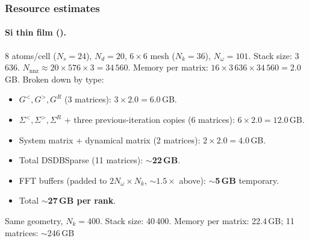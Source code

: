 \subsubsection{Resource estimates}

\paragraph{Si thin film (\cite{guo_quantum_2020}).}
8 atoms/cell ($N_s = 24$), $N_d = 20$, $6\times6$ mesh
($N_k = 36$), $N_\omega = 101$.  Stack size: 3\,636.
$N_\mathrm{nnz} \approx 20\times576\times3 = 34\,560$.
Memory per matrix: $16\times3\,636\times34\,560 = 2.0$\,GB.
Broken down by type:
\begin{itemize}
  \item $G^<, G^>, G^R$ (3 matrices): $3\times2.0 = 6.0$\,GB.
  \item $\Sigma^<, \Sigma^>, \Sigma^R$ + three previous-iteration copies
        (6 matrices): $6\times2.0 = 12.0$\,GB.
  \item System matrix + dynamical matrix (2 matrices): $2\times2.0 =
        4.0$\,GB.
  \item Total DSDBSparse (11 matrices): $\sim$\textbf{22\,GB}.
  \item FFT buffers (padded to $2N_\omega\times N_k$,
        $\sim1.5\times$ above): $\sim$\textbf{5\,GB} temporary.
  \item Total $\sim$\textbf{27\,GB per rank}.
\end{itemize}

Same geometry, $N_k = 400$.  Stack size: 40\,400.
Memory per matrix: 22.4\,GB; 11 matrices: $\sim$246\,GB
